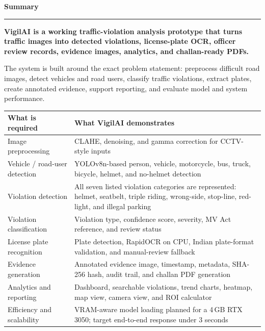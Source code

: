 \documentclass[11pt,a4paper]{article}
\begin{document}
\thispagestyle{empty}
{\Large\bfseries\color{vigilblue} Summary}
\vspace{4pt}\\
{\color{vigilaccent}\rule{\linewidth}{1pt}}
\vspace{6pt}

\noindent\textbf{VigilAI is a working traffic-violation analysis prototype that turns traffic images into detected violations, license-plate OCR, officer review records, evidence images, analytics, and challan-ready PDFs.}

\vspace{6pt}

\noindent The system is built around the exact problem statement: preprocess difficult road images, detect vehicles and road users, classify traffic violations, extract plates, create annotated evidence, support reporting, and evaluate model and system performance.

\vspace{8pt}

\begin{center}
\begin{tabular}{@{}p{3.5cm}p{9cm}@{}}
\hline
\textbf{What is required} & \textbf{What VigilAI demonstrates} \\
\hline
Image preprocessing & CLAHE, denoising, and gamma correction for CCTV-style inputs \\
Vehicle / road-user detection & YOLOv8n-based person, vehicle, motorcycle, bus, truck, bicycle, helmet, and no-helmet detection \\
Violation detection & All seven listed violation categories are represented: helmet, seatbelt, triple riding, wrong-side, stop-line, red-light, and illegal parking \\
Violation classification & Violation type, confidence score, severity, MV Act reference, and review status \\
License plate recognition & Plate detection, RapidOCR on CPU, Indian plate-format validation, and manual-review fallback \\
Evidence generation & Annotated evidence image, timestamp, metadata, SHA-256 hash, audit trail, and challan PDF generation \\
Analytics and reporting & Dashboard, searchable violations, trend charts, heatmap, map view, camera view, and ROI calculator \\
Efficiency and scalability & VRAM-aware model loading planned for a 4\,GB RTX 3050; target end-to-end response under 3 seconds \\
\hline
\end{tabular}
\end{center}
\end{document}
